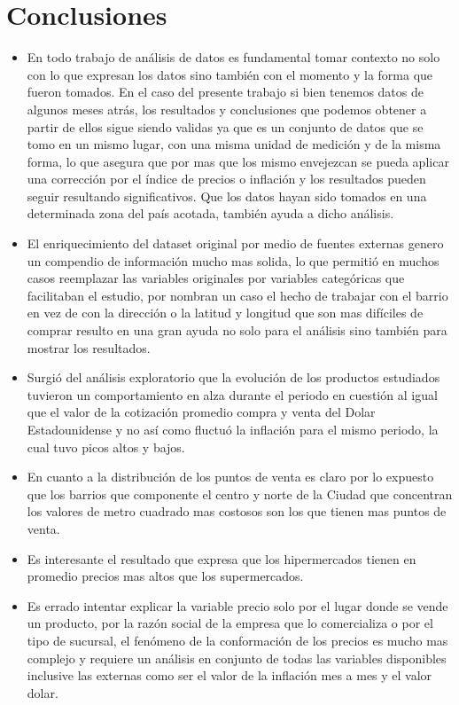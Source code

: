 
\section{Conclusiones}

\begin{itemize}
  \item En todo trabajo de análisis de datos es fundamental tomar contexto no solo con lo que expresan los datos sino también con el momento y la forma que fueron tomados. En el caso del presente trabajo si bien tenemos datos de algunos meses atrás, los resultados y conclusiones que podemos obtener a partir de ellos sigue siendo validas ya que es un conjunto de datos que se tomo en un mismo lugar, con una misma unidad de medición y de la misma forma, lo que asegura que por mas que los mismo envejezcan se pueda aplicar una corrección por el índice de precios o inflación y los resultados pueden seguir resultando significativos. Que los datos hayan sido tomados en una determinada zona del país acotada, también ayuda a dicho análisis.
  \item El enriquecimiento del dataset original por medio de fuentes externas genero un compendio de información mucho mas solida, lo que permitió en muchos casos reemplazar las variables originales por variables categóricas que facilitaban el estudio, por nombran un caso el hecho de trabajar con el barrio en vez de con la dirección o la latitud y longitud que son mas difíciles de comprar resulto en una gran ayuda no solo para el análisis sino también para mostrar los resultados.
  \item Surgió del análisis exploratorio que la evolución de los productos estudiados tuvieron un comportamiento en alza durante el periodo en cuestión al igual que el valor de la cotización promedio compra y venta del Dolar Estadounidense y no así como fluctuó la inflación para el mismo periodo, la cual tuvo picos altos y bajos.
  \item En cuanto a la distribución de los puntos de venta es claro por lo expuesto que los barrios que componente el centro y norte de la Ciudad que concentran los valores de metro cuadrado mas costosos son los que tienen mas puntos de venta.
  \item Es interesante el resultado que expresa que los hipermercados tienen en promedio precios mas altos que los supermercados.
  \item Es errado intentar explicar la variable precio solo por el lugar donde se vende un producto, por la razón social de la empresa que lo comercializa o por el tipo de sucursal, el fenómeno de la conformación de los precios es mucho mas complejo y requiere un análisis en conjunto de todas las variables disponibles inclusive las externas como ser el valor de la inflación mes a mes y el valor dolar.

\end{itemize}
